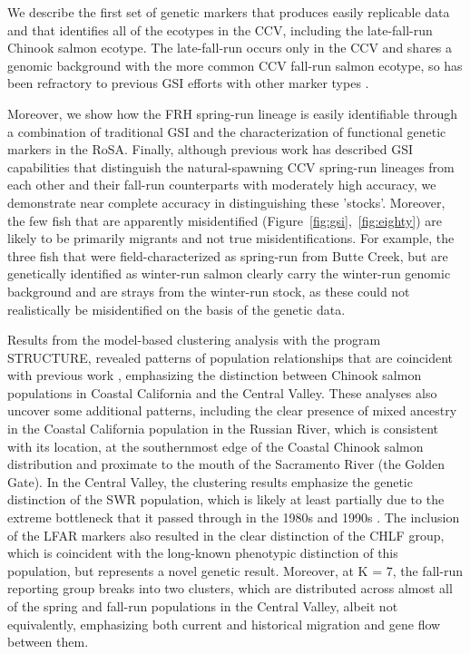 We describe the first set of genetic markers that produces easily replicable data and
that identifies all of the ecotypes in the CCV, including the late-fall-run Chinook salmon ecotype.
The late-fall-run occurs only in the CCV and shares a genomic background with the more
common CCV fall-run salmon ecotype, so has been refractory to previous GSI efforts with other marker types \citep{seeb2007development,clemento2014evaluation,meek2016sequencing,thompson2024genomics}. 


Moreover, we show how the FRH spring-run lineage is
easily identifiable through a combination of traditional GSI and the characterization
of functional genetic markers in the RoSA. Finally, although previous work has described
GSI capabilities that distinguish the natural-spawning CCV spring-run lineages from
each other and their fall-run counterparts with moderately high accuracy, we demonstrate
near complete accuracy in distinguishing these 'stocks'. Moreover, the few fish that are
apparently misidentified (Figure~\ref{fig:gsi},~\ref{fig:eighty}) are likely to be primarily migrants and not true misidentifications.
For example, the three fish that were field-characterized as spring-run from Butte Creek, but are
genetically identified as winter-run salmon clearly carry the winter-run genomic background and
are strays from the winter-run stock, as these could not realistically be misidentified on the 
basis of the genetic data.

Results from the model-based clustering analysis with the program STRUCTURE, revealed patterns 
of population relationships that are coincident with previous work 
\citep{clemento2014evaluation,kinziger2013contemporary}, emphasizing
the distinction between Chinook salmon populations 
in Coastal California and the Central Valley. These analyses also uncover some additional patterns, 
including the clear presence of mixed ancestry in the Coastal California population in the 
Russian River, which is consistent with its location, at the southernmost edge of the 
Coastal Chinook salmon distribution and proximate to the mouth of the Sacramento River 
(the Golden Gate). In the Central Valley, the clustering results emphasize the genetic 
distinction of the SWR population, which is likely at least partially due to 
the extreme bottleneck that it passed through in the 1980s and 1990s \citep{hedrick1994effective}. The inclusion 
of the LFAR markers also resulted in the clear distinction of the CHLF group, which 
is coincident with the long-known phenotypic distinction of this population, but represents a novel 
genetic result. Moreover, at K = 7, the fall-run reporting group breaks into two clusters, 
which are distributed across almost all of the spring and fall-run populations in the 
Central Valley, albeit not equivalently, emphasizing both current and historical migration and 
gene flow between them. 

